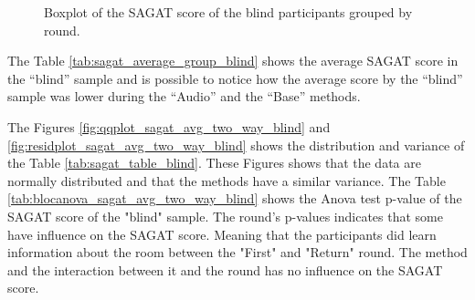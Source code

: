 \begin{figure}[!htb]
\begin{minipage}{0.45\textwidth}
        \caption{Boxplot of the SAGAT score of the blind participants grouped by round.}
        \label{fig:boxplot_sagat_blind_rounds}
    \end{minipage}
\end{figure}

The Table \ref{tab:sagat_average_group_blind} shows the average SAGAT score in the “blind” sample and is possible to notice how the average score by the “blind” sample was lower during the “Audio” and the “Base” methods.




The Figures \ref{fig:qqplot_sagat_avg_two_way_blind} and \ref{fig:residplot_sagat_avg_two_way_blind} shows the distribution and variance of the Table \ref{tab:sagat_table_blind}. These Figures shows that the data are normally distributed and that the methods have a similar variance.
The Table \ref{tab:blocanova_sagat_avg_two_way_blind} shows the Anova test p-value of the SAGAT score of the "blind" sample. The round's p-values indicates that some have influence on the SAGAT score. Meaning that the participants did learn information about the room between the "First" and "Return" round. The method and the interaction between it and the round has no influence on the SAGAT score.



